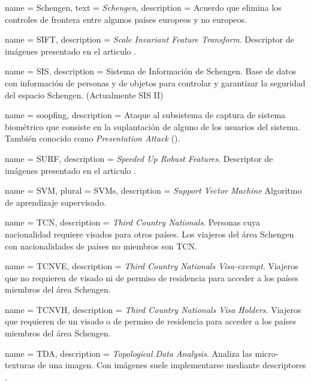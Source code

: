 {
    name        = {Schengen},
    text        = {\mbox{\textit{Schengen}}},
    description = {Acuerdo que elimina los controles de frontera entre algunos países europeos y no europeos.}
}

{
    name        = SIFT,
    description = {\textit{Scale Invariant Feature Transform}. Descriptor de imágenes presentado en el articulo \cite{lowe2004distinctive}.}
}

{
    name        = SIS,
    description = {Sistema de Información de \gls{Schengen}. Base de datos con información de personas y de objetos para controlar y garantizar la seguridad del espacio \gls{Schengen}. (Actualmente SIS II)}
}

{
    name        = soopfing,
    description = {Ataque al subsistema de captura de sistema biométrico que consiste en la suplantación de alguno de los usuarios del sistema. También conocido como \textit{Presentation Attack} ().}
}

{
    name        = SURF,
    description = {\textit{Speeded Up Robust Features}. Descriptor de imágenes presentado en el articulo \cite{bay2008speeded}.}
}

{
    name        = SVM,
    plural      = SVMs,
    description = {\textit{Support Vector Machine} Algoritmo de aprendizaje supervisado.}
}

{
    name        = TCN,
    description = {\textit{Third Country Nationals}. Personas cuya nacionalidad requiere visados para otros países. Los viajeros del área \Gls{Schengen} con nacionalidades de países no miembros son TCN.}
}

{
    name        = TCNVE,
    description = {\textit{Third Country Nationals Visa-exempt}. Viajeros  que no requieren de visado ni de permiso de residencia para acceder a los países miembros del área \Gls{Schengen}.}
}

{
    name        = TCNVH,
    description = {\textit{Third Country Nationals Visa Holders}. Viajeros  que requieren de un visado o de permiso de residencia para acceder a los países miembros del área \Gls{Schengen}.}
}

{
    name        = TDA,
    description = {\textit{Topological Data Analysis}. Analiza las micro-texturas de una imagen. Con imágenes suele implementarse mediante descriptores .}
}

